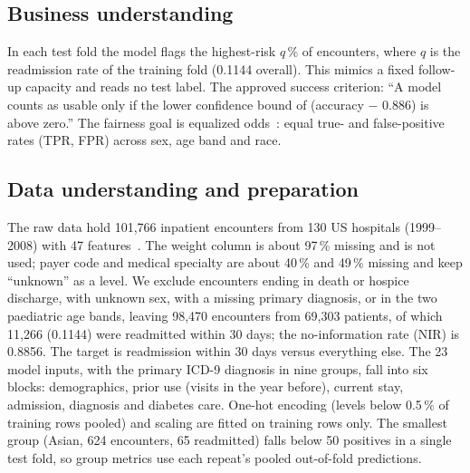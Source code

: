 \documentclass[conference]{IEEEtran}
\begin{document}
\subsection{Business understanding}
In each test fold the model flags the highest-risk $q$\,\% of encounters, where $q$ is the
readmission rate of the training fold (0.1144 overall). %
This mimics a fixed follow-up capacity and reads no test label. The approved success criterion:
``A model counts as usable only if the lower confidence bound of (accuracy
$-$ 0.886) is above zero.'' The fairness goal is equalized odds~\cite{hardt2016}: equal
true- and false-positive rates (TPR, FPR) across sex, age band and race.

\subsection{Data understanding and preparation}
The raw data hold 101,766 inpatient encounters from 130 US hospitals (1999--2008) with 47
features~\cite{strack2014}. %
The weight column is about 97\,\% missing and is not used; payer code and medical specialty are
about 40\,\% and 49\,\% missing and keep ``unknown'' as a level. %
We exclude encounters ending in death or hospice discharge, with unknown sex, with a missing primary
diagnosis, or in the two paediatric age bands, leaving 98,470 encounters from 69,303 patients, of
which 11,266 (0.1144) were readmitted within 30 days; the no-information rate (NIR) is 0.8856.
The target is readmission within 30 days versus everything else. The 23 model inputs, with the
primary ICD-9 diagnosis in nine groups, fall into six blocks: demographics, prior use
(visits in the year before), current stay, admission, diagnosis and diabetes care.
One-hot encoding (levels below 0.5\,\% of training rows pooled) and scaling are fitted on
training rows only. %
The smallest group (Asian, 624 encounters, 65
readmitted) falls below 50 positives in a single test fold, so group metrics use each repeat's
pooled out-of-fold predictions. %
\end{document}
